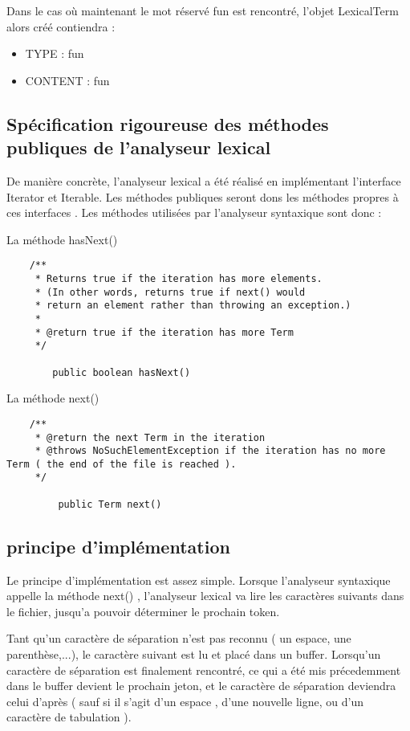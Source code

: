 Dans le cas où maintenant le mot réservé fun est rencontré, l'objet LexicalTerm alors créé contiendra : 
\begin{itemize}
	\item TYPE : fun
	\item CONTENT : fun
\end{itemize}

\subsection{Spécification rigoureuse des méthodes publiques de l'analyseur lexical}

De manière concrète, l'analyseur lexical a été réalisé en implémentant l'interface Iterator et Iterable. Les méthodes publiques seront dons les méthodes propres à ces interfaces . Les méthodes utilisées par l'analyseur syntaxique sont donc :

La méthode hasNext()
\begin{verbatim}
    /**
     * Returns true if the iteration has more elements.
     * (In other words, returns true if next() would
     * return an element rather than throwing an exception.)
     *
     * @return true if the iteration has more Term
     */
		
		public boolean hasNext()
\end{verbatim}


La méthode next()
\begin{verbatim}
    /**
     * @return the next Term in the iteration
     * @throws NoSuchElementException if the iteration has no more Term ( the end of the file is reached ).
     */

		 public Term next()
\end{verbatim}


\subsection{principe d'implémentation}

Le principe d'implémentation est assez simple. Lorsque l'analyseur syntaxique appelle la méthode next() , l'analyseur lexical va lire les caractères suivants dans le fichier, jusqu'a pouvoir déterminer le prochain token.

Tant qu'un caractère de séparation n'est pas reconnu ( un espace, une parenthèse,...), le caractère suivant est lu et placé dans un buffer. Lorsqu'un caractère de séparation est finalement rencontré, ce qui a été mis précedemment dans le buffer devient le prochain jeton, et le caractère de séparation deviendra celui d'après ( sauf si il s'agit d'un espace , d'une nouvelle ligne, ou d'un caractère de tabulation ).

